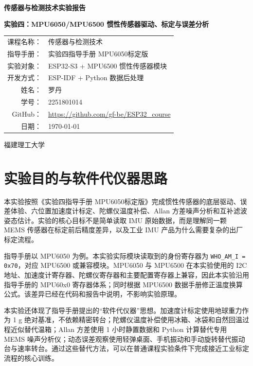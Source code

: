 \documentclass[UTF8,a4paper,12pt]{ctexart}
\newcommand{\code}[1]{\texttt{#1}}
\begin{document}
\begin{titlepage}
\centering
\vspace*{2.2cm}
{\bfseries 传感器与检测技术实验报告\par}
\vspace{1.2cm}
{\bfseries 实验四：MPU6050/MPU6500 惯性传感器驱动、标定与误差分析\par}
\vspace{2.2cm}
\begin{tabular}{rl}
课程名称：& 传感器与检测技术\\[0.6cm]
指导手册：& 实验四指导手册 MPU6050标定版\\[0.6cm]
实验对象：& ESP32-S3 + MPU6500 惯性传感器模块\\[0.6cm]
开发方式：& ESP-IDF + Python 数据后处理\\[0.6cm]
姓名：& 罗丹\\[0.6cm]
学号：& 2251801014\\[0.6cm]
GitHub：& \url{https://github.com/gf-be/ESP32_course}\\[0.6cm]
日期：& \today\\
\end{tabular}
\vfill
{福建理工大学\par}
\end{titlepage}

\tableofcontents
\clearpage

\section{实验目的与软件代仪器思路}
本实验按照《实验四指导手册 MPU6050标定版》完成惯性传感器的底层驱动、误差体验、六位置加速度计标定、陀螺仪温度补偿、Allan 方差噪声分析和互补滤波姿态估计。实验的核心目标不是简单读取 IMU 原始数据，而是理解同一颗 MEMS 传感器在标定前后精度差异，以及工业 IMU 产品为什么需要复杂的出厂标定流程。

指导手册以 MPU6050 为例。本实验实际模块读取到的身份寄存器为 \code{WHO\_AM\_I = 0x70}，对应 MPU6500 或兼容模块。MPU6050 与 MPU6500 在本实验使用的 I2C 地址、加速度计寄存器、陀螺仪寄存器和主要配置寄存器上兼容，因此本实验沿用指导手册的 MPU60x0 寄存器体系；同时根据 MPU6500 数据手册修正温度换算公式。该差异已经在代码和报告中说明，不影响实验原理。

本实验还体现了指导手册提出的“软件代仪器”思想。加速度计标定使用地球重力作为 1 g 绝对基准，不依赖精密转台；陀螺仪温度补偿使用冰箱、冰袋和自然回温过程近似替代温箱；Allan 方差使用 1 小时静置数据和 Python 计算替代专用 MEMS 噪声分析仪；动态误差观察使用轻弹桌面、手机振动和手动旋转替代振动台与速率转台。通过这些替代方法，可以在普通课程实验条件下完成接近工业标定流程的核心训练。
\end{document}
